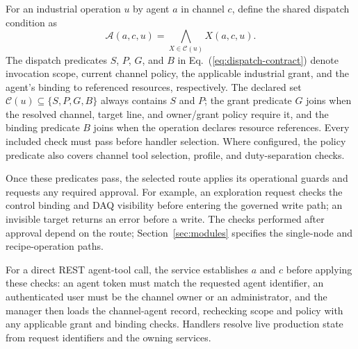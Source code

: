 For an industrial operation $u$ by agent $a$ in channel $c$, define the
shared dispatch condition as
\begin{equation}
\mathcal{A}(a,c,u)=\bigwedge_{X\in\mathcal{C}(u)}X(a,c,u).
\label{eq:dispatch-contract}
\end{equation}
The dispatch predicates $S$, $P$, $G$, and $B$ in Eq.~(\ref{eq:dispatch-contract}) denote invocation scope, current channel policy,
the applicable industrial grant, and the agent's binding to referenced resources,
respectively. The declared set $\mathcal{C}(u)\subseteq\{S,P,G,B\}$ always contains
$S$ and $P$; the grant predicate $G$ joins when the resolved channel, target line, and owner/grant policy
require it, and the binding predicate $B$ joins when the operation declares resource references. Every included check must pass before handler
selection. Where configured, the policy predicate also covers channel tool
selection, profile, and duty-separation checks.

Once these predicates pass, the selected route applies its operational
guards and requests any required approval. For example, an exploration request checks
the control binding and DAQ visibility before entering the governed write
path; an invisible target returns an error before a write. The checks performed
after approval depend on the route; Section~\ref{sec:modules} specifies the
single-node and recipe-operation paths.

For a direct REST agent-tool call, the service establishes $a$ and $c$ before applying these checks: an agent token must match the requested agent identifier, an authenticated user must be the channel owner or an administrator, and the manager then loads the channel-agent record, rechecking scope and policy with any applicable grant and binding checks. Handlers resolve live production state
from request identifiers and the owning services.



